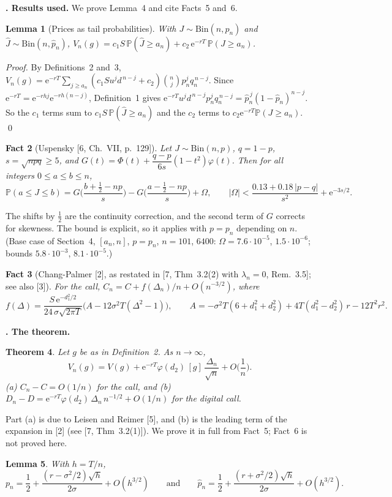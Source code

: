 \documentclass[11pt,a4paper]{article}
\theoremstyle{tight}
\newtheorem{thm}{Theorem}
\newtheorem{lem}[thm]{Lemma}
\newtheorem{fact}[thm]{Fact}
\theoremstyle{tightrm}
\newcounter{sect}\setcounter{sect}{-1}
\newcommand{\sect}[1]{\par\vspace{1.5pt}\noindent\stepcounter{sect}\textbf{\thesect. #1}\enspace}
\newcommand{\Prob}{\mathbb{P}}
\newcommand{\e}{\mathrm{e}}
\renewenvironment{proof}[1][Proof]{\par\textit{#1.}\enspace}{\qed\par}
\begin{document}
\sect{Results used.} We prove Lemma~4 and cite Facts~5 and~6.
\begin{lem}[Prices as tail probabilities] 
With $J\sim\mathrm{Bin}(n,p_n)$ and $\hat J\sim\mathrm{Bin}(n,\hat p_n)$, $V_n(g)=c_1S\,\Prob(\hat J\ge a_n)+c_2\,\e^{-rT}\,\Prob(J\ge a_n)$.
\end{lem}
\begin{proof}
By Definitions~2 and~3, $V_n(g)=\e^{-rT}\sum_{j\ge a_n}(c_1Su^jd^{\,n-j}+c_2)\binom nj p_n^jq_n^{\,n-j}$. Since $\e^{-rT}=\e^{-rhj}\e^{-rh(n-j)}$, Definition~1 gives $\e^{-rT}u^jd^{\,n-j}p_n^jq_n^{\,n-j}=\hat p_n^{\,j}(1-\hat p_n)^{n-j}$. So the $c_1$ terms sum to $c_1S\,\Prob(\hat J\ge a_n)$ and the $c_2$ terms to $c_2\e^{-rT}\Prob(J\ge a_n)$.
\end{proof}
\begin{fact}[Uspensky {[6, Ch.~VII, p.~129]}]
Let $J\sim\mathrm{Bin}(n,p)$, $q=1-p$, $s=\sqrt{npq}\ge5$, and $G(t)=\Phi(t)+\dfrac{q-p}{6s}(1-t^2)\varphi(t)$. Then for all integers $0\le a\le b\le n$,
\[
\Prob(a\le J\le b)=G\Big(\frac{b+\frac12-np}{s}\Big)-G\Big(\frac{a-\frac12-np}{s}\Big)+\Omega, \qquad |\Omega|<\frac{0.13+0.18\,|p-q|}{s^2}+\e^{-3s/2}.
\]
\end{fact}
The shifts by $\tfrac12$ are the continuity correction, and the second term of $G$ corrects for skewness. The bound is explicit, so it applies with $p=p_n$ depending on $n$. (Base case of Section~4, $[a_n,n]$, $p=p_n$, $n=101$, $6400$: $\Omega=7.6\cdot10^{-5}$, $1.5\cdot10^{-6}$; bounds $5.8\cdot10^{-3}$, $8.1\cdot10^{-5}$.)
\begin{fact}[Chang-Palmer {[2]}, as restated in {[7, Thm~3.2(2) with $\lambda_n=0$, Rem.~3.5]}; see also {[3]}]
For the call, $C_n=C+f(\Delta_n)/n+O(n^{-3/2})$, where
\[
f(\Delta)=\frac{S\,\e^{-d_1^2/2}}{24\,\sigma\sqrt{2\pi T}}\Big(A-12\sigma^2T(\Delta^2-1)\Big),\qquad A=-\sigma^2T(6+d_1^2+d_2^2)+4T(d_1^2-d_2^2)\,r-12T^2r^2 .
\]
\end{fact}
\sect{The theorem.}
\begin{thm}
Let $g$ be as in Definition~2. As $n\to\infty$,
\[
V_n(g)=V(g)+\e^{-rT}\varphi(d_2)\,[g]\,\frac{\Delta_n}{\sqrt n}+O\Big(\frac1n\Big).
\]
\textup{(a)} $C_n-C=O(1/n)$ for the call, and \textup{(b)}
$D_n-D=\e^{-rT}\varphi(d_2)\,\Delta_n\,n^{-1/2}+O(1/n)$ for the digital call.
\end{thm}
Part (a) is due to Leisen and Reimer [5], and (b) is the leading term of the expansion in [2] (see [7, Thm~3.2(1)]). We prove it in full from Fact~5; Fact~6 is not proved here.
\begin{lem}
With $h=T/n$,
\[
p_n=\frac12+\frac{(r-\sigma^2/2)\sqrt h}{2\sigma}+O(h^{3/2})\qquad\text{and}\qquad \hat p_n=\frac12+\frac{(r+\sigma^2/2)\sqrt h}{2\sigma}+O(h^{3/2}).
\]
\end{lem}
\end{document}
